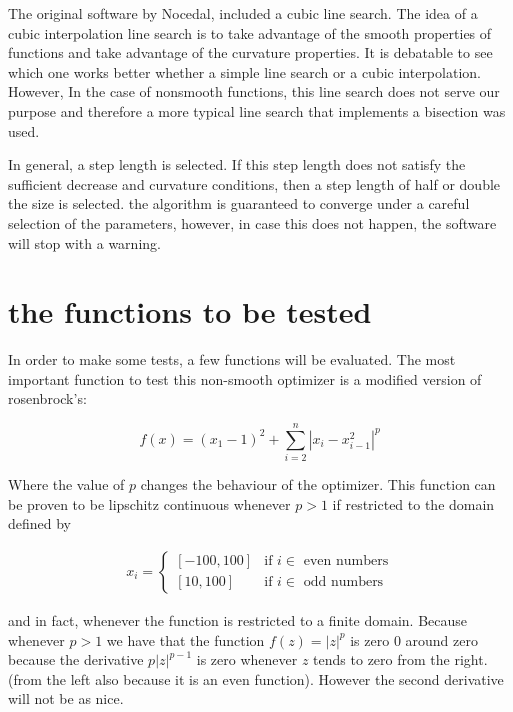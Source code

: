 The original software by Nocedal\citep{Nocedal}, included a cubic line search. The idea of a cubic interpolation line search is to take advantage of the smooth properties of functions and take advantage of the curvature properties. It is debatable to see which one works better whether a simple line search or a cubic interpolation. However, In the case of nonsmooth functions, this line search does not serve our purpose and therefore a more typical line search that implements a bisection was used.

In general, a step length is selected. If this step length does not satisfy the sufficient decrease and curvature conditions, then a step length of half or double the size is selected. the algorithm is guaranteed to converge under a careful selection of the parameters, however, in case this does not happen, the software will stop with a warning. 

\section{the functions to be tested}

In order to make some tests, a few functions will be evaluated. The most important function to test this non-smooth optimizer is a modified version of rosenbrock's:

\begin{equation}
    f(x) = (x_1 - 1)^2 + \sum_{i = 2}^n |x_i - x_{i - 1}^2|^p
\end{equation}

Where the value of $p$ changes the behaviour of the optimizer. This function can be proven to be lipschitz continuous whenever $p > 1$ if restricted to the domain defined by 

\begin{equation}
  \begin{aligned}
    x_i = 
    \begin{cases}
      [-100, 100] & \text{if } i \in \text{ even numbers} \\
      [10, 100] & \text{if } i \in \text{ odd numbers}
    \end{cases}
  \end{aligned}
\end{equation}

and in fact, whenever the function is restricted to a finite domain.  Because whenever $p > 1$ we have that the function $f(z) = |z|^p$ is zero $0$ around zero because the derivative $p |z| ^{p-1}$ is zero whenever $z$ tends to zero from the right. (from the left also because it is an even function). However the second derivative will not be as nice.

